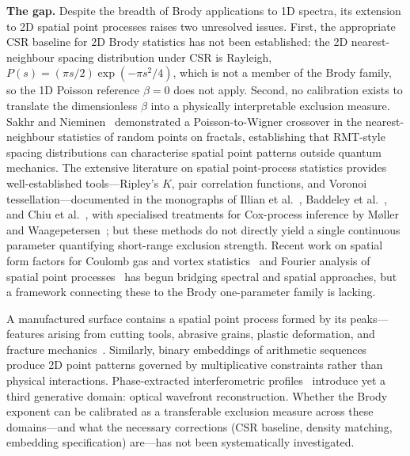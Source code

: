 \documentclass[final,3p,times,twocolumn]{elsarticle}
\theoremstyle{definition}
\begin{document}
\textbf{The gap.} Despite the breadth of Brody applications to 1D
spectra, its extension to 2D spatial point processes raises two
unresolved issues. First, the appropriate CSR baseline for 2D Brody
statistics has not been established: the 2D nearest-neighbour spacing
distribution under CSR is Rayleigh, $P(s)=(\pi s/2)\exp(-\pi s^2/4)$,
which is not a member of the Brody family, so the 1D Poisson reference
$\beta=0$ does not apply. Second, no calibration exists to translate
the dimensionless $\beta$ into a physically interpretable exclusion
measure. Sakhr and Nieminen~\cite{SAKHR-NIEMINEN-2005} demonstrated
a Poisson-to-Wigner crossover in the nearest-neighbour statistics of
random points on fractals, establishing that RMT-style spacing
distributions can characterise spatial point patterns outside quantum
mechanics. The extensive literature on spatial point-process
statistics provides well-established tools---Ripley's $K$, pair
correlation functions, and Voronoi tessellation---documented in the
monographs of Illian et al.~\cite{ILLIAN-2008}, Baddeley
et al.~\cite{BADDELEY-2015}, and Chiu et al.~\cite{CHIU-2013},
with specialised treatments for Cox-process inference by
M{\o}ller and Waagepetersen~\cite{MOLLER-WAAGEPETERSEN-2002};
but these methods do not directly yield a
single continuous parameter quantifying short-range exclusion
strength. Recent work on spatial form factors for Coulomb gas and
vortex statistics~\cite{MASSARO-DELCAMPO-2025} and Fourier analysis
of spatial point processes~\cite{YANG-GUAN-2026} has begun bridging
spectral and spatial approaches, but a framework connecting these to
the Brody one-parameter family is lacking. 

A manufactured surface
contains a spatial point process formed by its peaks---features
arising from cutting tools, abrasive grains, plastic deformation,
and fracture mechanics~\cite{HELMLI-2011-FV}. Similarly, binary
embeddings of arithmetic sequences produce 2D point patterns governed
by multiplicative constraints rather than physical interactions.
Phase-extracted interferometric profiles~\cite{KUCHARSKI-2025-MEASUREMENT}
introduce yet a third generative domain: optical wavefront
reconstruction. Whether the Brody exponent can be calibrated as a
transferable exclusion measure across these domains---and what the
necessary corrections (CSR baseline, density matching, embedding
specification) are---has not been systematically investigated.
\end{document}
